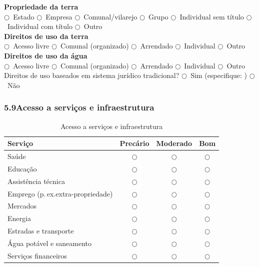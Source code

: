 \noindent\textbf{Propriedade da terra}\\
$\bigcirc$~Estado \quad $\bigcirc$~Empresa \quad $\bigcirc$~Comunal/vilarejo \quad $\bigcirc$~Grupo \quad $\bigcirc$~Individual sem título \quad $\bigcirc$~Individual com título \quad $\bigcirc$~Outro\\[4pt]
\textbf{Direitos de uso da terra}\\
$\bigcirc$~Acesso livre \quad $\bigcirc$~Comunal (organizado) \quad $\bigcirc$~Arrendado \quad $\bigcirc$~Individual \quad $\bigcirc$~Outro\\[4pt]
\textbf{Direitos de uso da água}\\
$\bigcirc$~Acesso livre \quad $\bigcirc$~Comunal (organizado) \quad $\bigcirc$~Arrendado \quad $\bigcirc$~Individual \quad $\bigcirc$~Outro\\[4pt]
Direitos de uso baseados em sistema jurídico tradicional? $\bigcirc$~Sim (especifique: \dotfill) $\bigcirc$~Não

\subsubsection*{5.9\quad Acesso a serviços e infraestrutura}

\begin{table}[htbp]
\centering\small
\caption{Acesso a serviços e infraestrutura}
\label{tab:app_services}
\begin{tabular}{lccc}
\toprule
\textbf{Serviço} & \textbf{Precário} & \textbf{Moderado} & \textbf{Bom} \\
\midrule
Saúde                         & $\bigcirc$ & $\bigcirc$ & $\bigcirc$ \\
Educação                      & $\bigcirc$ & $\bigcirc$ & $\bigcirc$ \\
Assistência técnica            & $\bigcirc$ & $\bigcirc$ & $\bigcirc$ \\
Emprego (p.\,ex.\@ extra-propriedade) & $\bigcirc$ & $\bigcirc$ & $\bigcirc$ \\
Mercados                      & $\bigcirc$ & $\bigcirc$ & $\bigcirc$ \\
Energia                       & $\bigcirc$ & $\bigcirc$ & $\bigcirc$ \\
Estradas e transporte          & $\bigcirc$ & $\bigcirc$ & $\bigcirc$ \\
Água potável e saneamento      & $\bigcirc$ & $\bigcirc$ & $\bigcirc$ \\
Serviços financeiros           & $\bigcirc$ & $\bigcirc$ & $\bigcirc$ \\
\bottomrule
\end{tabular}
\end{table}

